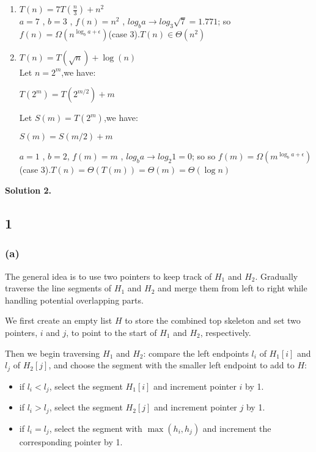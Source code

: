 \documentclass[12pt]{article}
\newcommand{\solution}[1]{\noindent \textbf{Solution #1.}}
\begin{document}
\begin{enumerate}
        \item $T(n) = 7T(\frac{n}{3}) + n^2$\\
        $a=7$ , $b=3$ , $f(n) = n^2$ , $log_b a \rightarrow log_3 \sqrt{7} = 1.771$; so $f(n) = \Omega(n^{\log_b a + \epsilon})$(case 3).$T(n) \in \Theta(n^2)$

        \item $T(n) = T(\sqrt{n}) + \log(n)$\\
        Let $n =2^m$,we have:

        \begin{center}
            $T(2^m) = T(2^{m/2}) + m$
        \end{center}

        Let $S(m) = T(2^m)$,we have:

        \begin{center}
            $S(m) = S(m/2) + m$
        \end{center}

        $a=1$ , $b=2$, $f(m) = m$ , $log_b a \rightarrow log_2 1 = 0$; so so $f(m) = \Omega(m^{\log_b a + \epsilon})$(case 3).$T(n) = \Theta(T(m)) =  \Theta(m) = \Theta(\log n)$


    \end{enumerate}

\newpage

\solution{2}
    \subsection*{1}
        \subsubsection*{(a)}

        \hspace{1.5em}The general idea is to use two pointers to keep track of $H_1$ and $H_2$. Gradually traverse the line segments of $H_1$ and $H_2$ and merge them from left to right while handling potential overlapping parts.

        We first create an empty list $H$ to store the combined top skeleton and set two pointers, $i$ and $j$, to point to the start of $H_1$ and $H_2$, respectively.

        Then we begin traversing $H_1$ and $H_2$: compare the left endpoints $l_i$ of $H_1[i]$ and $l_j$ of $H_2[j]$, and choose the segment with the smaller left endpoint to add to $H$:
        \begin{itemize}
            \item if $l_i < l_j$, select the segment $H_1[i]$ and increment pointer $i$ by 1.
            \item if $l_i > l_j$, select the segment $H_2[j]$ and increment pointer $j$ by 1.
            \item if $l_i = l_j$, select the segment with $\max(h_i, h_j)$ and increment the corresponding pointer by 1.
        \end{itemize}
\end{document}
